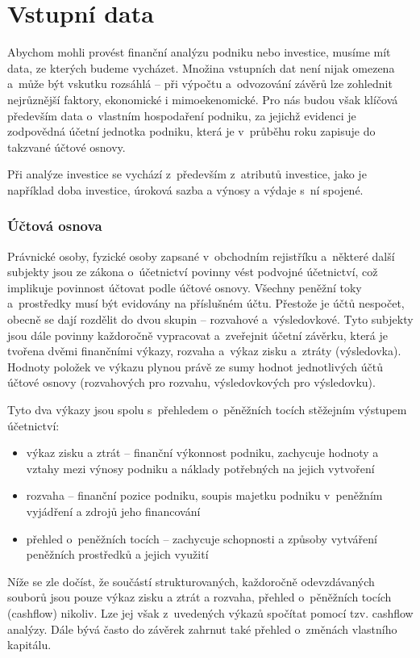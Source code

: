 \section{Vstupní data}
Abychom mohli provést finanční analýzu podniku nebo investice, musíme mít data, ze kterých budeme vycházet. Množina vstupních dat není nijak omezena a~může být vskutku rozsáhlá -- při výpočtu a~odvozování závěrů lze zohlednit nejrůznější faktory, ekonomické i mimoekenomické. Pro nás budou však klíčová především data o~vlastním hospodaření podniku, za jejichž evidenci je zodpovědná účetní jednotka podniku, která je v~průběhu roku zapisuje do takzvané účtové osnovy. 

Při analýze investice se vychází z~především  z~atributů investice, jako je například doba investice, úroková sazba a výnosy a výdaje s~ní spojené.

\subsubsection{Účtová osnova}
Právnické osoby, fyzické osoby zapsané v~obchodním rejistříku a~některé další subjekty jsou ze zákona o~účetnictví povinny vést podvojné účetnictví, což implikuje povinnost účtovat podle účtové osnovy. Všechny peněžní toky a~prostředky musí být evidovány na příslušném účtu. Přestože je účtů nespočet, obecně se dají rozdělit do dvou skupin -- rozvahové a~výsledovkové. Tyto subjekty jsou dále povinny každoročně vypracovat a~zveřejnit účetní závěrku, která je tvořena dvěmi finančními výkazy, rozvaha a~výkaz zisku a~ztráty (výsledovka). Hodnoty položek ve výkazu plynou právě ze sumy hodnot jednotlivých účtů účtové osnovy (rozvahových pro rozvahu, výsledovkových pro výsledovku).

Tyto dva výkazy jsou spolu s~přehledem o~pěněžních tocích stěžejním výstupem účetnictví:

\begin{itemize}
	\item výkaz zisku a ztrát -- finanční výkonnost podniku, zachycuje hodnoty a vztahy mezi výnosy podniku a náklady potřebných na jejich vytvoření
	\item rozvaha -- finanční pozice podniku, soupis majetku podniku v~peněžním vyjádření a zdrojů jeho financování
	\item přehled o~peněžních tocích -- zachycuje schopnosti a způsoby vytváření peněžních prostředků a jejich využití
\end{itemize}


Níže se zle dočíst, že součástí strukturovaných, každoročně odevzdávaných souborů jsou pouze výkaz zisku a ztrát a rozvaha, přehled o~pěněžních tocích (cashflow) nikoliv. Lze jej však z~uvedených výkazů spočítat pomocí tzv. cashflow analýzy. Dále bývá často do závěrek zahrnut také přehled o~změnách vlastního kapitálu.


